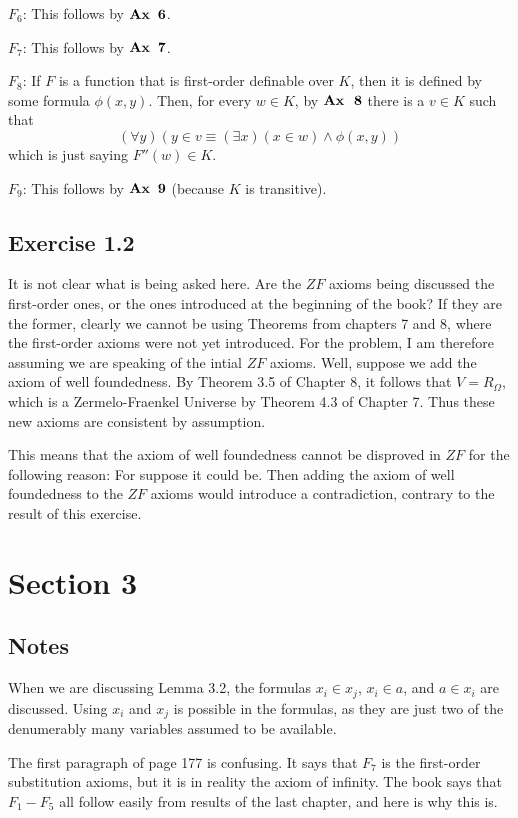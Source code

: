 \documentclass{article}
\theoremstyle{definition}
\begin{document}
$F_6$: This follows by $\textbf{Ax\, 6}$.

$F_7$: This follows by $\textbf{Ax\, 7}$.

$F_8$: If $F$ is a function that is first-order definable over $K$, then it is defined by 
some formula $\phi(x,y)$. Then, for every $w\in K$, by $\textbf{Ax\; 8}$ there is a $v\in K$ such that
\[ (\forall y)(y\in v\equiv(\exists x)(x\in w)\wedge\phi(x,y)) \]
which is just saying $F''(w)\in K$.

$F_9$: This follows by $\textbf{Ax\, 9}$ (because $K$ is transitive).

\subsection*{Exercise 1.2}
It is not clear what is being asked here. Are the $ZF$ axioms being discussed the first-order ones, or the ones introduced at the beginning 
of the book? If they are the former, clearly we cannot be using Theorems from chapters 7 and 8, where the first-order axioms 
were not yet introduced. For the problem, I am therefore assuming we are speaking of the intial $ZF$ axioms. Well, suppose we 
add the axiom of well foundedness. By Theorem 3.5 of Chapter 8, it follows that $V=R_\Omega$, which is a Zermelo-Fraenkel Universe
by Theorem 4.3 of Chapter 7. Thus these new axioms are consistent by assumption.

This means that the axiom of well foundedness cannot be disproved in $ZF$ for the following reason: For suppose it could be. 
Then adding the axiom of well foundedness to the $ZF$ axioms would introduce a contradiction, contrary to the result of this 
exercise.

\section*{Section 3}

\subsection*{Notes}
When we are discussing Lemma 3.2, the formulas $x_i\in x_j$, $x_i\in a$, and $a\in x_i$ are discussed. Using 
$x_i$ and $x_j$ is possible in the formulas, as they are just two of the denumerably many variables assumed to be available.

The first paragraph of page 177 is confusing. It says that $F_7$ is the first-order substitution axioms, but it is in reality 
the axiom of infinity. The book says that $F_1-F_5$ all follow easily from results of the last chapter, and here is why this is.
\end{document}
